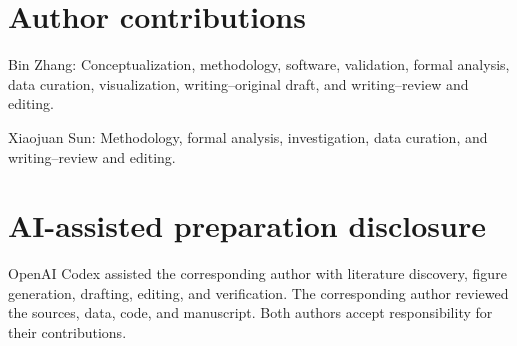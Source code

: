 \documentclass[12pt]{article}
\begin{document}
\section*{Author contributions}
Bin Zhang: Conceptualization, methodology, software, validation, formal
analysis, data curation, visualization, writing--original draft, and
writing--review and editing.

Xiaojuan Sun: Methodology, formal analysis, investigation, data curation, and
writing--review and editing.

\section*{AI-assisted preparation disclosure}
OpenAI Codex assisted the corresponding author with literature discovery,
figure generation, drafting, editing, and verification. The corresponding
author reviewed the sources, data, code, and manuscript. Both authors accept
responsibility for their contributions.



\end{document}
